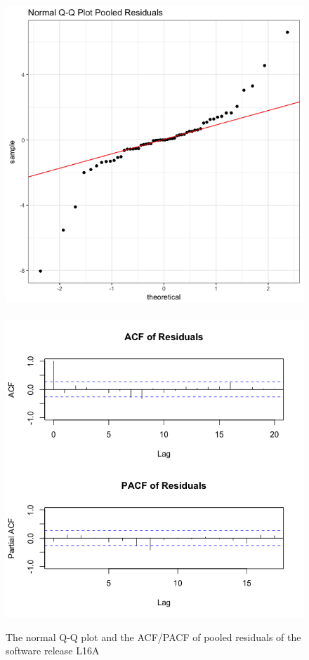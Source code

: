 \begin{figure}[h]
\begin{centering}
\includegraphics[scale=0.3]{picture/L16A_QQPool}$\quad$\includegraphics[scale=0.3]{picture/L16A_ACFPool}
\par\end{centering}
\caption{The normal Q-Q plot and the ACF/PACF of pooled residuals of the software
release L16A}
\label{L16A_plotDiag}
\end{figure}



